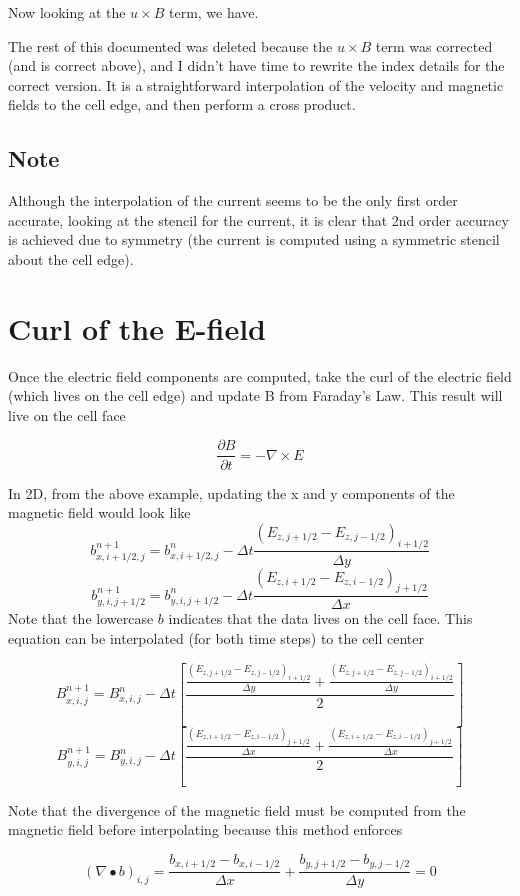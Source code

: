 \documentclass[11pt]{article}
\begin{document}
Now looking at the $u\times B$ term, we have.

The rest of this documented was deleted because the $u \times B$ term was corrected (and is correct above), and I didn't have time to rewrite the index details for the correct version. It is a straightforward interpolation of the velocity and magnetic fields to the cell edge, and then perform a cross product.


\subsection{Note}
Although the interpolation of the current seems to be the only first order accurate, looking at the stencil for the current, it is clear that 2nd order accuracy is achieved due to symmetry (the current is computed using a symmetric stencil about the cell edge).

\section{Curl of the E-field}
Once the electric field components are computed, take the curl of the electric field (which lives on the cell edge) and update B from Faraday's Law. This result will live on the cell face

\begin{equation}
	\frac{\partial B}{\partial t} = - \nabla \times E
\end{equation}

In 2D, from the above example, updating the x and y components of the magnetic field would look like
\begin{equation}
	b_{x,i+1/2,j}^{n+1} = b_{x,i+1/2,j}^{n} - 
	\Delta t
	\frac{(E_{z,j+1/2}-E_{z,j-1/2})_{i+1/2}}{\Delta y}
\end{equation}
\begin{equation}
	b_{y,i,j+1/2}^{n+1} = b_{y,i,j+1/2}^{n} - 
	\Delta t
	\frac{(E_{z,i+1/2}-E_{z,i-1/2})_{j+1/2}}{\Delta x}
\end{equation}
Note that the lowercase $b$ indicates that the data lives on the cell face. This equation can be interpolated (for both time steps) to the cell center

\begin{equation}
	B_{x,i,j}^{n+1} = B_{x,i,j}^{n} - 
	\Delta t
	\left[
	\frac{\frac{(E_{z,j+1/2}-E_{z,j-1/2})_{i+1/2}}{\Delta y} 
	+
	\frac{(E_{z,j+1/2}-E_{z,j-1/2})_{i+1/2}}{\Delta y}}{2}
	\right]
\end{equation}
\begin{equation}
	B_{y,i,j}^{n+1} = B_{y,i,j}^{n} - 
	\Delta t
	\left[
	\frac{\frac{(E_{z,i+1/2}-E_{z,i-1/2})_{j+1/2}}{\Delta x} 
	+
	\frac{(E_{z,i+1/2}-E_{z,i-1/2})_{j+1/2}}{\Delta x}}{2}
	\right]
\end{equation}

Note that the divergence of the magnetic field must be computed from the magnetic field before interpolating because this method enforces

\begin{equation}
	(\nabla \bullet b)_{i,j} = 
	\frac{b_{x,i+1/2}-b_{x,i-1/2}}{\Delta x}
	+
	\frac{b_{y,j+1/2}-b_{y,j-1/2}}{\Delta y}
	=
	0
\end{equation}
\end{document}

